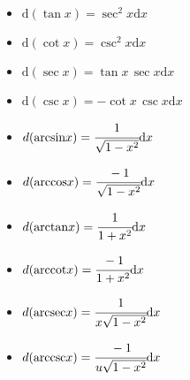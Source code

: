 \def\du\dx{{  }}
\def\d{{ \text{d} }}
\def\dx{{ \d x}}
\def\du{{ \d u }}
\def\dv{{ \d v }}

\def\sech{{ \mathop{\text{sech}} }}
\def\csch{{ \mathop{\text{csch}} }}

\def\arcsin{{ \mathop{\text{arcsin}} }}
\def\arccos{{ \mathop{\text{arccos}} }}
\def\arctan{{ \mathop{\text{arctan}} }}
\def\arccot{{ \mathop{\text{arccot}} }}
\def\arcsec{{ \mathop{\text{arcsec}} }}
\def\arccsc{{ \mathop{\text{arccsc}} }}

\def\arcsinh{{ \mathop{\text{arcsinh}} }}
\def\arccosh{{ \mathop{\text{arccosh}} }}
\def\arctanh{{ \mathop{\text{arctanh}} }}
\def\arccoth{{ \mathop{\text{arccoth}} }}
\def\arcsech{{ \mathop{\text{arcsech}} }}
\def\arccsch{{ \mathop{\text{arccsch}} }}

\begin{itemize}
\item $ \displaystyle \d(\tan x) = \sec^2 x \dx $
\item $ \displaystyle \d(\cot x) = \csc^2 x \dx $
\item $ \displaystyle \d(\sec x) = \tan x \, \sec x \dx $
\item $ \displaystyle \d(\csc x) = -\cot x \, \csc x \dx $
\item $ \displaystyle d(\arcsin x) = \cfrac{1}{\sqrt{1 - x^2}} \dx $
\item $ \displaystyle d(\arccos x) = \cfrac{-1}{\sqrt{1 - x^2}} \dx $
\item $ \displaystyle d(\arctan x) = \cfrac{1}{1 + x^2} \dx $
\item $ \displaystyle d(\arccot x) = \cfrac{-1}{1 + x^2} \dx $
\item $ \displaystyle d(\arcsec x) = \cfrac{1}{x \sqrt{1 - x^2}}\dx $
\item $ \displaystyle d(\arccsc x) = \cfrac{-1}{u \sqrt{1 - x^2}}\dx $
\end{itemize}

